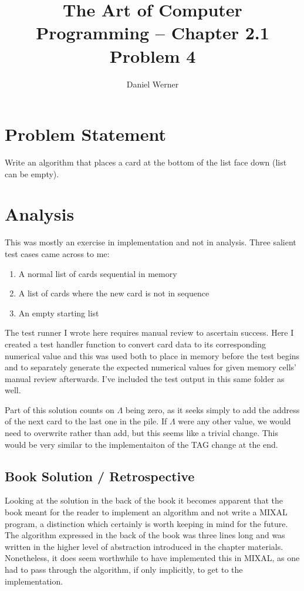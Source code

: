\documentclass{article}
\title{The Art of Computer Programming -- Chapter 2.1 Problem 4}
\author{Daniel Werner}
\begin{document}
\maketitle

\section*{
    Problem Statement
}

Write an algorithm that places a card at the bottom of the list face down (list can be empty).

\section*{
    Analysis
}

This was mostly an exercise in implementation and not in analysis.  Three salient test cases came across to me:
\begin{enumerate}
  \item A normal list of cards sequential in memory
  \item A list of cards where the new card is not in sequence
  \item An empty starting list
\end{enumerate}

The test runner I wrote here requires manual review to ascertain success.  Here I created a test handler function to convert card data to its corresponding numerical value and this was used both to place in memory before the test begins and to separately generate the expected numerical values for given memory cells' manual review afterwards.  I've included the test output in this same folder as well.

\par

Part of this solution counts on $\Lambda$ being zero, as it seeks simply to add the address of the next card to the last one in the pile.  If $\Lambda$ were any other value, we would need to overwrite rather than add, but this seems like a trivial change.  This would be very similar to the implementaiton of the TAG change at the end.

\subsection* {
  Book Solution / Retrospective
}

Looking at the solution in the back of the book it becomes apparent that the book meant for the reader to implement an algorithm and not write a MIXAL program, a distinction which certainly is worth keeping in mind for the future.  The algorithm expressed in the back of the book was three lines long and was written in the higher level of abstraction introduced in the chapter materials.  Nonetheless, it does seem worthwhile to have implemented this in MIXAL, as one had to pass through the algorithm, if only implicitly, to get to the implementation.
\end{document}
